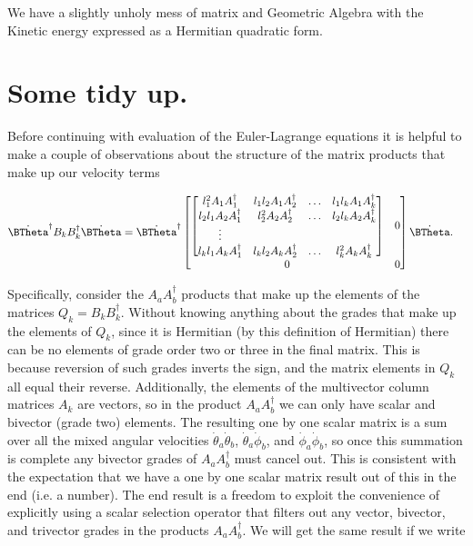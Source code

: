 We have a slightly unholy mess of matrix and Geometric Algebra with the Kinetic energy expressed as a Hermitian quadratic form.

\section{Some tidy up.}

Before continuing with evaluation of the Euler-Lagrange equations it is helpful to make a couple of observations about the structure of the matrix products that make up our velocity terms

\begin{align}\label{eqn:sPolarArxiv:boo8}
\dot{\BTheta}^\dagger
B_k B_k^\dagger
\dot{\BTheta}
&=
\dot{\BTheta}^\dagger
\begin{bmatrix}
\begin{bmatrix}
l_1^2 A_1 A_1^\dagger & l_1 l_2 A_1 A_2^\dagger & \hdots & l_1 l_k A_1 A_k^\dagger \\
l_2 l_1 A_2 A_1^\dagger & l_2^2 A_2 A_2^\dagger & \hdots & l_2 l_k A_2 A_k^\dagger \\
\vdots \\
l_k l_1 A_k A_1^\dagger & l_k l_2 A_k A_2^\dagger & \hdots & l_k^2 A_k A_k^\dagger
\end{bmatrix} & 0 \\
0 & 0
\end{bmatrix}
\dot{\BTheta}.
\end{align}

Specifically, consider the $A_a A_b^\dagger$ products that make up the elements of the matrices $Q_k = B_k B_k^\dagger$.  Without knowing anything about the grades that make up the elements of $Q_k$, since it is Hermitian (by this definition of Hermitian) there can be no elements of grade order two or three in the final matrix.  This is because reversion of such grades inverts the sign, and the matrix elements in $Q_k$ all equal their reverse.  Additionally, the elements of the multivector column matrices $A_k$ are vectors, so in the product $A_a A_b^\dagger$ we can only have scalar and bivector (grade two) elements.  The resulting one by one scalar matrix is a sum over all the mixed angular velocities $\dot{\theta}_a \dot{\theta}_b$, $\dot{\theta}_a \dot{\phi}_b$, and $\dot{\phi}_a \dot{\phi}_b$, so once this summation is complete any bivector grades of $A_a A_b^\dagger$ must cancel out.  This is consistent with the expectation that we have a one by one scalar matrix result out of this in the end (i.e. a number).  The end result is a freedom to exploit the convenience of explicitly using a scalar selection operator that filters out any vector, bivector, and trivector grades in the products $A_a A_b^\dagger$.  We will get the same result if we write

